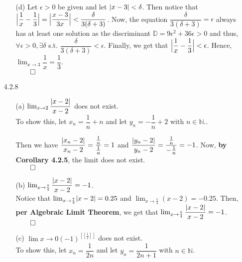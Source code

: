 \documentclass[11pt]{article}
\DeclarePairedDelimiter\abs{\lvert}{\rvert}%
\DeclarePairedDelimiter\absb{\Big\lvert}{\Big\rvert}%
\newcommand{\nats}{\mathbb{N}}
\begin{document}
\begin{itemize}
\begin{itemize}
            \item[(d)]
                Let $\epsilon > 0$ be given and let $\abs{x - 3} < \delta$.
                Then notice that $\absb{\dfrac{1}{x} - \dfrac{1}{3}} =
                \absb{\dfrac{x - 3}{3x}} < \dfrac{\delta}{3(\delta + 3)}$. Now,
                the equation $\dfrac{\delta}{3(\delta + 3)} = \epsilon$ always
                has at least one solution as the discriminant $\mathbb{D} =
                9\epsilon^2 + 36 \epsilon > 0$ and thus, $\forall \epsilon > 0,
                \exists \delta$ s.t. $\dfrac{\delta}{3(\delta + 3)} <
                \epsilon$. Finally, we get that $\absb{\dfrac{1}{x} -
                \dfrac{1}{3}} < \epsilon$.  Hence, $\lim_{x \to 3} \dfrac{1}{x}
                = \dfrac{1}{3}$.\\
                $\qed$
                
        \end{itemize}

    \item[4.2.8]
        \begin{itemize}
            \item[(a)]
                $\lim_{x \to 2} \dfrac{\abs{x - 2}}{x - 2}$ does not exist.
                \\
                To show this, let $x_n = \dfrac{1}{n} + n$ and let $y_n =
                -\dfrac{1}{n} + 2$ with $n \in \nats$..

                Then we have $\dfrac{\abs{x_n - 2}}{x_n - 2} =
                \dfrac{\frac{1}{n}}{\frac{1}{n}} = 1$ and $\dfrac{\abs{y_n -
                2}}{y_n - 2} = \dfrac{\frac{1}{n}}{-\frac{1}{n}} = -1$.
                Now, \textbf{by Corollary 4.2.5}, the limit does not exist.\\
                $\qed$

            \item[(b)]
                $\lim_{x \to \frac{7}{4}} \dfrac{\abs{x - 2}}{x - 2} = -1$.
                \\
                Notice that $\lim_{x \to \frac{7}{4}} \abs{x - 2} = 0.25$ and
                $\lim_{x \to \frac{7}{4}} (x - 2) = -0.25$. Then, \textbf{per
                Algebraic Limit Theorem}, we get that $\lim_{x \to \frac{7}{4}}
                \dfrac{\abs{x - 2}}{x - 2} = -1$.\\
                $\qed$

            \item[(c)]
                $\lim{x \to 0} (-1)^{[[\frac{1}{x}]]}$ does not exist.
                \\
                To show this, let $x_n = \dfrac{1}{2n}$ and let $y_n =
                \dfrac{1}{2n + 1}$ with $n \in \nats$.


\end{itemize}
\end{itemize}
\end{document}
